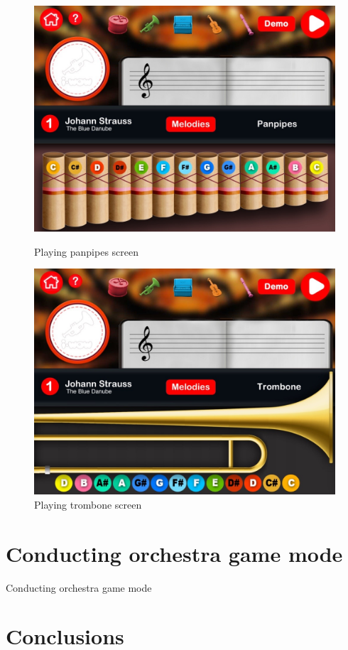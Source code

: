 \begin{figure}[ht!]
	\centering
	\includegraphics[width=400pt]{graphics/use-case/playing_panpipes_screen.jpg}
	\vspace{0.05cm}
	\caption{Playing panpipes screen}
	\label{fig:playing_panpipes_screen}
	\vspace{0.6cm}

	\includegraphics[width=400pt]{graphics/use-case/playing_trombone_screen.jpg}
	\vspace{0.05cm}
	\caption{Playing trombone screen}
	\label{fig:playing_trombone_screen}
\end{figure}

\FloatBarrier

\newpage
\section{Conducting orchestra game mode}
\label{sec:conductingorchestragm}

Conducting orchestra game mode

\newpage
\section{Conclusions}

